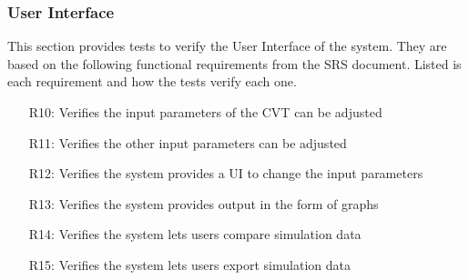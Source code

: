 \documentclass[12pt, titlepage]{article}
\begin{document}
\subsubsection{User Interface}

This section provides tests to verify the User Interface of the system.
They are based on the following functional requirements from the SRS document.
Listed is each requirement and how the tests verify each one.
\begin{itemize}
  \item [R10:] Verifies the input parameters of the CVT can be adjusted
  \item [R11:] Verifies the other input parameters can be adjusted
  \item [R12:] Verifies the system provides a UI to change the input parameters
  \item [R13:] Verifies the system provides output in the form of graphs
  \item [R14:] Verifies the system lets users compare simulation data
  \item [R15:] Verifies the system lets users export simulation data
\end{itemize}
\end{document}
